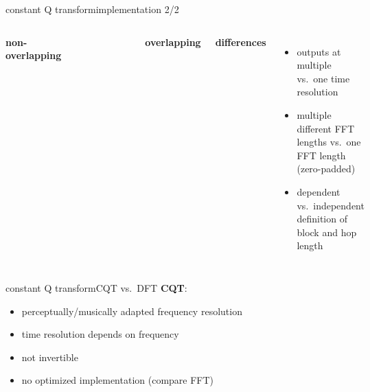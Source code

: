         \begin{frame}{constant Q transform}{implementation 2/2}
            \vspace{-5mm}
            \begin{columns}
                    \begin{center}\textbf{non-overlapping}\end{center}
                    \vspace{-8mm}
                    \begin{figure}
                    \centering
                        \scalebox{1.2}{}
                    \end{figure}
                    \begin{center}\textbf{overlapping}\end{center}
                    \vspace{10mm}
                    \vspace{15mm}
                    \begin{center}\textbf{differences}\end{center}
                    \begin{itemize}
                        \item   outputs at multiple vs.\ one time resolution
                        \item   multiple different FFT lengths vs.\ one FFT length (zero-padded)
                        \item   dependent vs.\ independent definition of block and hop length
                    \end{itemize}
                    \vspace{15mm}
                \end{columns}
        \end{frame}	

        \begin{frame}{constant Q transform}{CQT vs.\ DFT}
            \textbf{CQT}:
            \bigskip
            \begin{itemize}
                \item<1->[+]	perceptually/musically adapted frequency resolution
                \smallskip
                \item<2->[--]	time resolution depends on frequency
                \smallskip
                \item<3->[--]	not invertible
                \smallskip
                \item<4->[--]	no optimized implementation (compare FFT)
            \end{itemize}
        \end{frame}	

